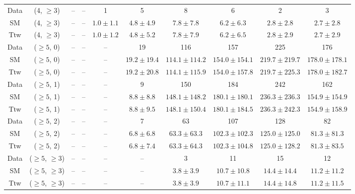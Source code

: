 \begin{table}[h!]
{\begin{tabular}{cccccccccc}
	Data & (4, $\ge3$) & -- & -- & 1 & 5 & 8 & 6 & 2 & 3 \\[0.5ex] 
	SM & (4, $\ge3$) & -- & -- & $1.0\pm 1.1$ & $4.8\pm 4.9$ & $7.8\pm 7.8$ & $6.2\pm 6.3$ & $2.8\pm 2.8$ & $2.7\pm 2.8$ \\[0.5ex] 
	Ttw & (4, $\ge3$) & -- & -- & $1.0\pm 1.2$ & $4.8\pm 5.2$ & $7.8\pm 7.9$ & $6.2\pm 6.5$ & $2.8\pm 2.9$ & $2.7\pm 2.9$ \\[0.5ex] 
	Data & ($\ge5$, 0) & -- & -- & -- & 19 & 116 & 157 & 225 & 176 \\[0.5ex] 
	SM & ($\ge5$, 0) & -- & -- & -- & $19.2\pm 19.4$ & $114.1\pm 114.2$ & $154.0\pm 154.1$ & $219.7\pm 219.7$ & $178.0\pm 178.1$ \\[0.5ex] 
	Ttw & ($\ge5$, 0) & -- & -- & -- & $19.2\pm 20.8$ & $114.1\pm 115.9$ & $154.0\pm 157.8$ & $219.7\pm 225.3$ & $178.0\pm 182.7$ \\[0.5ex] 
	Data & ($\ge5$, 1) & -- & -- & -- & 9 & 150 & 184 & 242 & 162 \\[0.5ex] 
	SM & ($\ge5$, 1) & -- & -- & -- & $8.8\pm 8.8$ & $148.1\pm 148.2$ & $180.1\pm 180.1$ & $236.3\pm 236.3$ & $154.9\pm 154.9$ \\[0.5ex] 
	Ttw & ($\ge5$, 1) & -- & -- & -- & $8.8\pm 9.5$ & $148.1\pm 150.4$ & $180.1\pm 184.5$ & $236.3\pm 242.3$ & $154.9\pm 158.9$ \\[0.5ex] 
	Data & ($\ge5$, 2) & -- & -- & -- & 7 & 63 & 107 & 128 & 82 \\[0.5ex] 
	SM & ($\ge5$, 2) & -- & -- & -- & $6.8\pm 6.8$ & $63.3\pm 63.3$ & $102.3\pm 102.3$ & $125.0\pm 125.0$ & $81.3\pm 81.3$ \\[0.5ex] 
	Ttw & ($\ge5$, 2) & -- & -- & -- & $6.8\pm 7.4$ & $63.3\pm 64.3$ & $102.3\pm 104.8$ & $125.0\pm 128.2$ & $81.3\pm 83.5$ \\[0.5ex] 
	Data & ($\ge5$, $\ge3$) & -- & -- & -- & -- & 3 & 11 & 15 & 12 \\[0.5ex] 
	SM & ($\ge5$, $\ge3$) & -- & -- & -- & -- & $3.8\pm 3.9$ & $10.7\pm 10.8$ & $14.4\pm 14.4$ & $11.2\pm 11.2$ \\[0.5ex] 
	Ttw & ($\ge5$, $\ge3$) & -- & -- & -- & -- & $3.8\pm 3.9$ & $10.7\pm 11.1$ & $14.4\pm 14.8$ & $11.2\pm 11.5$ \\[0.5ex] 
	\hline
	\hline
\end{tabular}}
\end{table}

